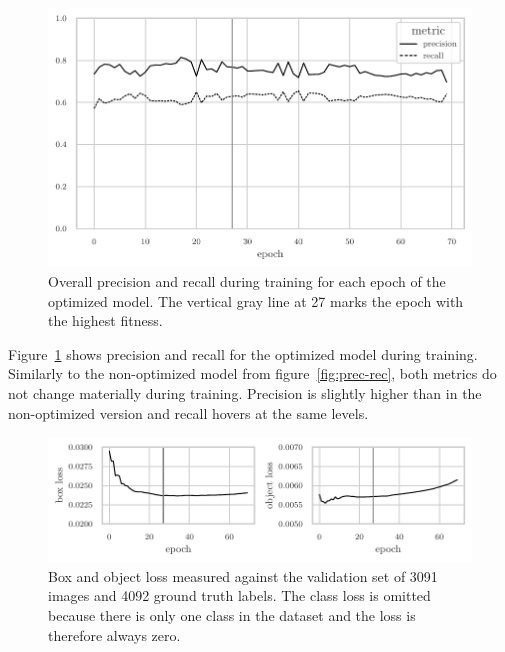 \documentclass[draft,final]{vutinfth} %
\begin{document}
\begin{figure}
  \centering
  \includegraphics{graphics/precision_recall_final.pdf}
  \caption[Hyper-parameter optimized object detection precision and
  recall during training.]{Overall precision and recall during
    training for each epoch of the optimized model. The vertical gray
    line at \num{27} marks the epoch with the highest fitness.}
  \label{fig:hyp-opt-prec-rec}
\end{figure}

Figure~\ref{fig:hyp-opt-prec-rec} shows precision and recall for the
optimized model during training. Similarly to the non-optimized model
from figure~\ref{fig:prec-rec}, both metrics do not change materially
during training. Precision is slightly higher than in the
non-optimized version and recall hovers at the same levels.

\begin{figure}
  \centering
  \includegraphics{graphics/val_box_obj_loss_final.pdf}
  \caption[Hyper-parameter optimized object detection box and object
  loss.]{Box and object loss measured against the validation set of
    \num{3091} images and \num{4092} ground truth labels. The class
    loss is omitted because there is only one class in the dataset and
    the loss is therefore always zero.}
  \label{fig:hyp-opt-box-obj-loss}
\end{figure}
\end{document}

